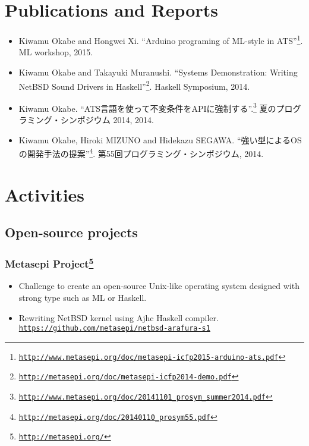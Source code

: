 \documentclass[letterpaper]{article}
\begin{document}
\section*{Publications and Reports}

\begin{itemize}
  \item Kiwamu Okabe and Hongwei Xi. ``Arduino programing of ML-style in ATS''\footnote{\href{http://www.metasepi.org/doc/metasepi-icfp2015-arduino-ats.pdf}{\tt http://www.metasepi.org/doc/metasepi-icfp2015-arduino-ats.pdf}}. ML workshop, 2015.
  \item Kiwamu Okabe and Takayuki Muranushi. ``Systems Demonstration: Writing NetBSD Sound Drivers in Haskell''\footnote{\href{http://metasepi.org/doc/metasepi-icfp2014-demo.pdf}{\tt http://metasepi.org/doc/metasepi-icfp2014-demo.pdf}}. Haskell Symposium, 2014.
  \item Kiwamu Okabe. ``ATS言語を使って不変条件をAPIに強制する''.\footnote{\href{http://www.metasepi.org/doc/20141101\_prosym\_summer2014.pdf}{\tt http://www.metasepi.org/doc/20141101\_prosym\_summer2014.pdf}} 夏のプログラミング・シンポジウム 2014, 2014.
  \item Kiwamu Okabe, Hiroki MIZUNO and Hidekazu SEGAWA. ``強い型によるOSの開発手法の提案''\footnote{\href{http://metasepi.org/doc/20140110\_prosym55.pdf}{\tt http://metasepi.org/doc/20140110\_prosym55.pdf}}. 第55回プログラミング・シンポジウム, 2014.
\end{itemize}

\section*{Activities}

\subsection*{Open-source projects}

\subsubsection*{Metasepi Project\footnote{\href{http://metasepi.org/}{\tt http://metasepi.org/}}}
\begin{itemize}
\item Challenge to create an open-source Unix-like operating system designed with strong type such as ML or Haskell.
\item Rewriting NetBSD kernel using Ajhc Haskell compiler. \href{https://github.com/metasepi/netbsd-arafura-s1}{\tt https://github.com/metasepi/netbsd-arafura-s1}
\end{itemize}
\end{document}
